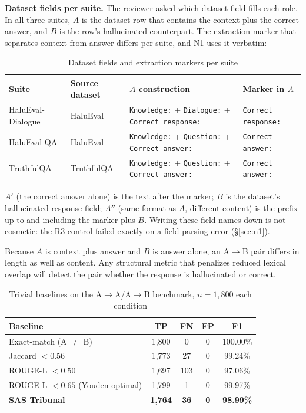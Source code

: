 \documentclass[11pt,a4paper]{article}
\begin{document}
\textbf{Dataset fields per suite.} The reviewer asked which dataset field fills each role. In all three suites, $A$ is the dataset row that contains the context plus the correct answer, and $B$ is the row's hallucinated counterpart. The extraction marker that separates context from answer differs per suite, and N1 uses it verbatim:\begin{table}[H]
\centering
\caption{Dataset fields and extraction markers per suite}
\label{tab:fields}
\begin{tabular}{@{}llll@{}}
\toprule
Suite & Source dataset & $A$ construction & Marker in $A$ \\
\midrule
HaluEval-Dialogue & HaluEval \citep{li2023halueval} & \texttt{Knowledge:} + \texttt{Dialogue:} + \texttt{Correct response:} & \texttt{Correct response: } \\
HaluEval-QA & HaluEval \citep{li2023halueval} & \texttt{Knowledge:} + \texttt{Question:} + \texttt{Correct answer:} & \texttt{Correct answer: } \\
TruthfulQA & TruthfulQA \citep{lin2022truthfulqa} & \texttt{Knowledge:} + \texttt{Question:} + \texttt{Correct answer:} & \texttt{Correct answer: } \\
\bottomrule
\end{tabular}
\end{table}

$A'$ (the correct answer alone) is the text after the marker; $B$ is the dataset's hallucinated response field; $A''$ (same format as $A$, different content) is the prefix up to and including the marker plus $B$. Writing these field names down is not cosmetic: the R3 control failed exactly on a field-parsing error (\S\ref{sec:n1}).

Because $A$ is context plus answer and $B$ is answer alone, an A$\rightarrow$B pair differs in length as well as content. Any structural metric that penalizes reduced lexical overlap will detect the pair whether the response is hallucinated or correct.

\begin{table}[H]
\centering
\caption{Trivial baselines on the A$\rightarrow$A/A$\rightarrow$B benchmark, $n=1{,}800$ each condition}
\label{tab:trivial-ab}
\begin{tabular}{@{}lcccc@{}}
\toprule
Baseline & TP & FN & FP & F1 \\
\midrule
Exact-match (A $\neq$ B) & 1{,}800 & 0 & 0 & 100.00\% \\
Jaccard $< 0.56$ & 1{,}773 & 27 & 0 & 99.24\% \\
ROUGE-L $< 0.50$ & 1{,}697 & 103 & 0 & 97.06\% \\
ROUGE-L $< 0.65$ (Youden-optimal) & 1{,}799 & 1 & 0 & 99.97\% \\
\midrule
\textbf{SAS Tribunal} & \textbf{1{,}764} & \textbf{36} & \textbf{0} & \textbf{98.99\%} \\
\bottomrule
\end{tabular}
\end{table}
\end{document}
